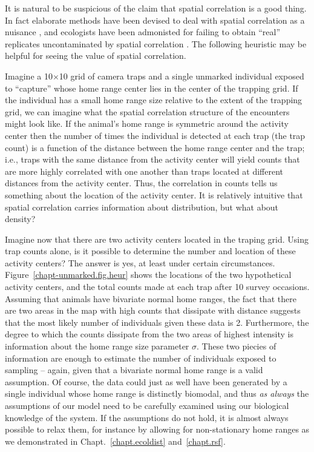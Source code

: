 It is natural to be suspicious of the claim that spatial correlation
is a good thing. In fact elaborate methods have been devised to deal
with spatial correlation as a nuisance %
\citep{lichstein_etal:2002,dormann_etal:2007}, and ecologists have been admonisted for
failing to obtain ``real'' replicates uncontaminated by spatial
correlation \citep{hurlbert:1984}. The following heuristic may be
helpful for seeing the value of spatial correlation.

Imagine a 10$\times$10 grid of camera traps and a single unmarked
individual exposed to ``capture'' whose home range center lies in the center of the
trapping grid. If the individual has a small home range size relative
to the extent of the trapping grid, we can imagine what the
spatial correlation structure of the encounters might look
like. If the animal's home range is symmetric around the activity center
then the number of times the individual is detected at each
trap (the trap count) is a function of the distance between the home
range center and the trap; i.e., traps with the same distance
from the activity center will yield counts that are more highly
correlated with one another than traps located at different distances
from the activity center. Thus, the correlation in counts tells us
something about the location of the activity center. It is relatively
intuitive that spatial correlation carries information about
distribution, but what about density?


Imagine now that there are two activity centers located in the traping
grid. Using trap counts alone, %
is it possible to determine the number and location of these activity
centers? The answer is yes, at least under certain circumstances.
Figure~\ref{chapt-unmarked.fig.heur} %
shows the locations of the two hypothetical activity centers, and the total
counts made at each trap after 10 survey occasions.
Assuming that animals have bivariate normal home
ranges, the fact that there are two areas in the map with high counts
that dissipate with distance suggests that the most likely number of
individuals given these data is 2. Furthermore, the degree to which
the counts dissipate from the two areas of highest intensity is
information about the home range size parameter $\sigma$. These two
piecies of information are enough to estimate the number of
individuals exposed to sampling -- again, given
that a bivariate normal home range is a valid assumption. Of course,
the data could just as well have been generated by a single individual
whose home range is distinctly biomodal, and thus \textit{as always}
the assumptions of our model need to be carefully examined using our
biological knowledge of the system. If the assumptions
do not hold, it is almost always possible to relax them, for instance
by allowing for non-stationary home ranges as we demonstrated in
Chapt.~\ref{chapt.ecoldist} and~\ref{chapt.rsf}.

